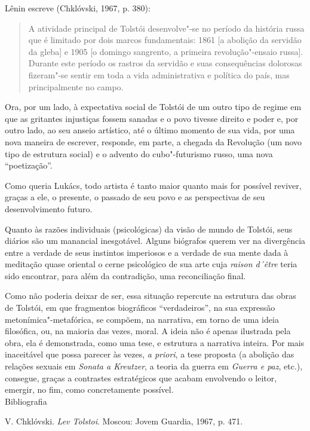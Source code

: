 Lênin escreve (Chklóvski, 1967, p. 380):

\begin{quote}
A atividade principal de Tolstói desenvolve"-se no período da história
russa que é limitado por dois marcos fundamentais: 1861 [a abolição da
servidão da gleba] e 1905 [o domingo sangrento, a primeira
revolução"-ensaio russa]. Durante este período os rastros da servidão
e suas consequências dolorosas fizeram"-se sentir em toda a vida
administrativa e política do país, mas principalmente no campo.
\end{quote}

Ora, por um lado, à expectativa social de Tolstói de um
outro tipo de regime em que as gritantes injustiças fossem sanadas e o
povo tivesse direito e poder e, por outro lado, ao seu anseio artístico,
até o último momento de sua vida, por uma nova maneira de escrever,
responde, em parte, a chegada da Revolução (um novo tipo de estrutura
social) e o advento do cubo"-futurismo russo, uma nova ``poetização''.

Como queria Lukács, todo artista é tanto maior quanto mais
for possível reviver, graças a ele, o presente, o passado de seu povo e
as perspectivas de seu desenvolvimento futuro.

Quanto às razões individuais (psicológicas) da visão de
mundo de Tolstói, seus diários são um manancial inesgotável. Alguns
biógrafos querem ver na divergência entre a verdade de seus instintos
imperiosos e a verdade de sua mente dada à meditação quase oriental o
cerne psicológico de sua arte cuja \emph{raison d´être} teria sido
encontrar, para além da contradição, uma reconciliação final.

Como não poderia deixar de ser, essa situação repercute na
estrutura das obras de Tolstói, em que fragmentos biográficos
``verdadeiros'', na sua expressão metonímica"-metafórica, se compõem, na
narrativa, em torno de uma ideia filosófica, ou, na maioria das vezes,
moral. A ideia não é apenas ilustrada pela obra, ela é demonstrada, como
uma tese, e estrutura a narrativa inteira. Por mais inaceitável que
possa parecer às vezes, \emph{a priori}, a tese proposta (a abolição
das relações sexuais em \emph{Sonata a Kreutzer}, a teoria da guerra
em \emph{Guerra e paz}, etc.), consegue, graças a contrastes
estratégicos que acabam envolvendo o leitor, emergir, no fim, como
concretamente possível. \\

Bibliografia

V. Chklóvski. \emph{Lev Tolstoi}. Moscou: Jovem Guardia, 1967, p. 471.


